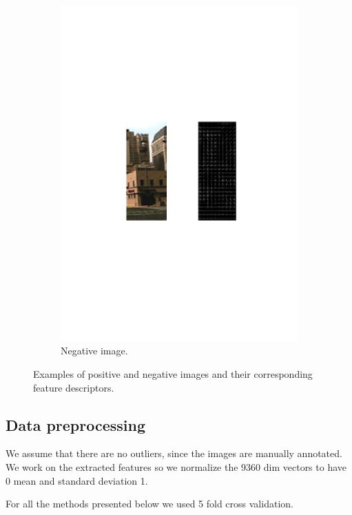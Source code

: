 \begin{figure}[h]
\begin{subfigure}[b]{0.45\textwidth}
    \includegraphics[width=\textwidth]{figures/negative_image.pdf}
    \caption{Negative image.}
  \end{subfigure}
  \caption{Examples of positive and negative images and their corresponding feature descriptors.}
  \label{fig:starting_images}
\end{figure}

\subsection{Data preprocessing}
\noindent We assume that there are no outliers, since the images are manually annotated. We work on the extracted features so we normalize the 9360 dim vectors to have  0 mean and standard deviation 1.

For all the methods presented below we used 5 fold cross validation.

